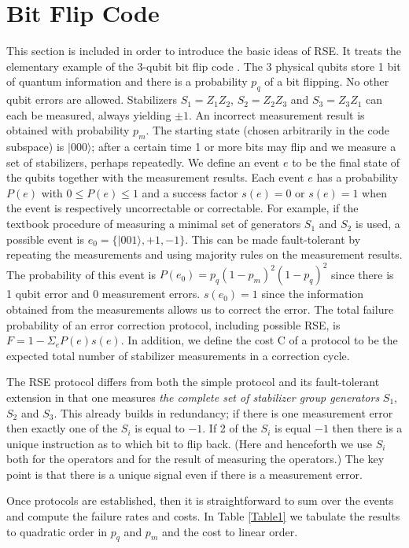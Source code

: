 \documentclass[reprint, superscriptaddress]{revtex4-1}
\numberwithin{equation}{section}
\numberwithin{figure}{section}
\numberwithin{table}{section}
\begin{document}
\section{Bit Flip Code}
This section is included in order to introduce the basic ideas of RSE.  It treats the elementary example of the 3-qubit bit flip code \cite{NielsenChuang}.  The 3 physical qubits store 1 bit of quantum information and there is a probability $p_q$ of a bit flipping.  No other qubit errors are allowed.  Stabilizers $S_1 = Z_1 Z_2$, $S_2 = Z_2 Z_3$ and $S_3 = Z_3 Z_1$ can each be measured, always yielding $\pm 1$.  An incorrect measurement result is obtained with probability $p_m$.  The starting state (chosen arbitrarily in the code subspace) is $ |000 \rangle $; after a certain time 1 or more bits may flip and we measure a set of stabilizers, perhaps repeatedly.  We define an event $e$ to be the final state of the qubits together with the measurement results.  Each event $e$ has a probability $P(e)$ with $0 \leq P(e) \leq 1$ and a success factor $s(e) = 0$ or $s(e) = 1$ when the event is respectively uncorrectable or correctable.  For example, if the textbook procedure of measuring a minimal set of generators $S_1$ and $S_2$ is used, a possible event is $e_0= \{|001 \rangle ,+1,-1\}$.  This can be made fault-tolerant by repeating the measurements and using majority rules on the measurement results.  The probability of this event is $P(e_0) = p_q (1-p_m)^2 (1-p_q)^2$  since there is 1 qubit error and 0 measurement errors.  $s(e_0) = 1$ since the information obtained from the measurements allows us to correct the error.  The total failure probability of an error correction protocol, including possible RSE, is $F = 1 - \Sigma_e P(e) s(e)$.  In addition, we define the cost C of a protocol to be the expected total number of stabilizer measurements in a correction cycle. 

The RSE protocol differs from both the simple protocol and its fault-tolerant extension in that one measures \textit{ the complete set of stabilizer group generators} $S_1$, $S_2$ and $S_3$.  This already builds in redundancy; if there is one measurement error then exactly one of the $S_i$ is equal to $-1$.  If 2 of the $S_i$ is equal $-1$ then there is a unique instruction as to which bit to flip back. (Here and henceforth we use $S_i$ both for the operators and for the result of measuring the operators.) The key point is that there is a unique signal even if there is a measurement error.

Once protocols are established, then it is straightforward to sum over the events and compute the failure rates and costs.  In Table \ref{Table1} we tabulate the results to quadratic order in $p_q$ and $p_m$ and the cost to linear order.
\end{document}
